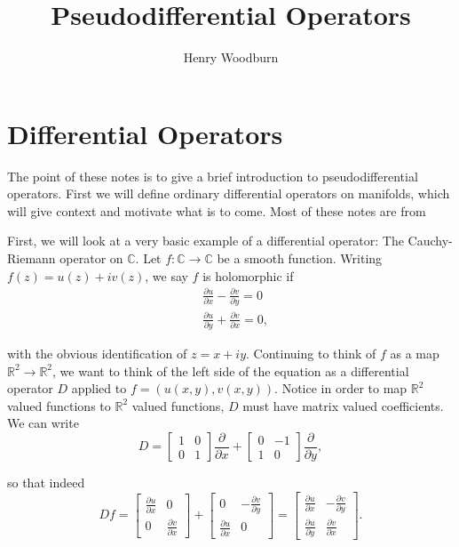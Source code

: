 \documentclass[14pt, reqno]{extarticle}
\theoremstyle{plain}
\theoremstyle{definition}
\theoremstyle{remark}
\newcommand{\RR}{\mathbb{R}}
\newcommand{\CC}{\mathbb{C}}
\newcommand{\der}[2]{\frac{\partial #1}{\partial #2}}
\begin{document}
\title{Pseudodifferential Operators}
\author{Henry Woodburn}
\maketitle

\tableofcontents

\section{Differential Operators}

The point of these notes is to give a brief introduction to pseudodifferential operators.
First we will define ordinary differential operators on manifolds, which will give context
and motivate what is to come. Most of these notes are from \cite{lawson}

First, we will look at a very basic example of a differential operator: The Cauchy-Riemann
operator on $\mathbb{C}$. Let $f: \CC \to \CC$ be a smooth function. Writing 
$f(z) = u(z) + i v(z)$, we say $f$ is holomorphic if
\begin{align}
    &\der{u}{x}-\der{v}{y} = 0\\
    &\der{u}{y} + \der{v}{x} = 0,
\end{align}

with the obvious identification of $z = x + iy$. Continuing to think of 
$f$ as a map $\RR^2 \to \RR^2$, we want to think of the left side of the equation as 
a differential operator $D$ applied to $f = (u(x,y),v(x,y))$. Notice in order to
map $\RR^2$ valued functions to $\RR^2$ valued functions, $D$ must have matrix 
valued coefficients. We can write
\[
    D = 
    \begin{bmatrix}
        1 & 0\\
        0 & 1
    \end{bmatrix} \der{}{x} + 
    \begin{bmatrix}
        0 & -1\\
        1 & 0
    \end{bmatrix} \der{}{y},
\]

so that indeed
\[
    Df = 
    \begin{bmatrix}
        \der{u}{x} & 0\\
        0 & \der{v}{x}
    \end{bmatrix} +
    \begin{bmatrix}
        0 & -\der{v}{y}\\
        \der{u}{x} & 0
    \end{bmatrix} 
    = 
    \begin{bmatrix}
        \der{u}{x} & -\der{v}{y}\\
        \der{u}{y} & \der{v}{x}
    \end{bmatrix}.
\]
\end{document}
